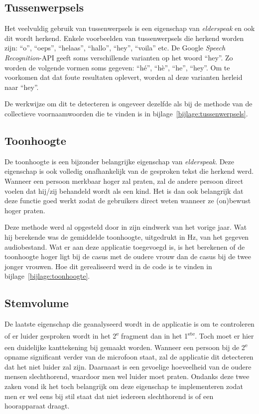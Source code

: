 \subsection{Tussenwerpsels}
Het veelvuldig gebruik van tussenwerpsels is een eigenschap van \textit{elderspeak} en ook dit wordt herkend. Enkele voorbeelden van tussenwerpsels die herkend worden zijn: ``o'', ``oeps'', ``helaas'', ``hallo'', ``hey'', ``voila'' etc. De Google \textit{Speech Recognition}-API geeft soms verschillende varianten op het woord ``hey''. Zo worden de volgende vormen soms gegeven: ``hé'', ``hè'', ``he'', ``hey''. Om te voorkomen dat dat foute resultaten oplevert, worden al deze varianten herleid naar ``hey''.

De werkwijze om dit te detecteren is ongeveer dezelfde als bij de methode van de collectieve voornaamwoorden die te vinden is in bijlage~\ref{bijlage:tussenwerpsels}.

\subsection{Toonhoogte}
De toonhoogte is een bijzonder belangrijke eigenschap van \textit{elderspeak}. Deze eigenschap is ook volledig onafhankelijk van de gesproken tekst die herkend werd. Wanneer een persoon merkbaar hoger zal praten, zal de andere persoon direct voelen dat hij/zij behandeld wordt als een kind. Het is dan ook belangrijk dat deze functie goed werkt zodat de gebruikers direct weten wanneer ze (on)bewust hoger praten.

Deze methode werd al opgesteld door \textcite{Standaert2021} in zijn eindwerk van het vorige jaar. Wat hij berekende was de gemiddelde toonhoogte, uitgedrukt in Hz, van het gegeven audiobestand. Wat er aan deze applicatie toegevoegd is, is het berekenen of de toonhoogte hoger ligt bij de casus met de oudere vrouw dan de casus bij de twee jonger vrouwen.
Hoe dit gerealiseerd werd in de code is te vinden in bijlage~\ref{bijlage:toonhoogte}.

\subsection{Stemvolume}
De laatste eigenschap die geanalyseerd wordt in de applicatie is om te controleren of er luider gesproken wordt in het 2\textsuperscript{e} fragment dan in het 1\textsuperscript{ste}. Toch moet er hier een duidelijke kanttekening bij gemaakt worden. Wanneer een persoon bij de 2\textsuperscript{e} opname significant verder van de microfoon staat, zal de applicatie dit detecteren dat het niet luider zal zijn. Daarnaast is een gevoelige hoeveelheid van de oudere mensen slechthorend, waardoor men wel luider moet praten. Ondanks deze twee zaken vond ik het toch belangrijk om deze eigenschap te implementeren zodat men er wel eens bij stil staat dat niet iedereen slechthorend is of een hoorapparaat draagt.

